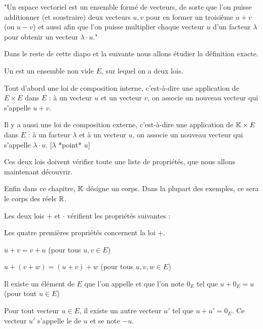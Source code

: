 "Un espace vectoriel est un ensemble formé de vecteurs, de sorte que l'on puisse
additionner (et soustraire) deux vecteurs $u,v$ pour en former un troisième $u+v$ (ou $u-v$)
et aussi afin que l'on puisse multiplier chaque vecteur $u$ d'un facteur $\lambda$ pour obtenir 
un vecteur $\lambda \cdot u$."

\change

Dans le reste de cette diapo et la suivante nous allons étudier la définition exacte.


Un  est un ensemble non vide $E$, sur lequel on a deux lois.

Tout d'abord une loi de composition interne, 
c'est-à-dire une application de $E \times E$ dans $E$ :
à un vecteur $u$ et un vecteur $v$, on associe un nouveau vecteur qui s'appelle $u+v$.

\change

Il y a aussi une loi de composition externe, 
  c'est-à-dire une application de $\mathbb{K} \times E$ dans $E$ : 
à un facteur $\lambda$ et à un vecteur $u$, on associe un nouveau vecteur qui s'appelle $\lambda \cdot u$.
[$\lambda$ *point* $u$]

  
Ces deux lois doivent vérifier toute une liste de propriétés, que nous allons maintenant découvrir.

\change 

Enfin dans ce chapitre, $\mathbb{K}$ désigne un corps. 
Dans la plupart des exemples, ce sera le corps des réels $\mathbb{R}$.

\diapo

Les deux lois $+$ et $\cdot$ vérifient les propriétés suivantes :

Les quatre premières propriétés concernent la loi $+$.

$u + v = v + u$ \quad (pour tous $u,v \in E$)

\change

$u + (v+w) = (u+v) +w$ \quad (pour tous $u,v,w \in E$)

\change

Il existe un élément de $E$ que l'on appelle  et que l'on note  $0_E$ 
tel que $u + 0_E = u$ \quad (pour tout $u \in E$)

\change

Pour tout vecteur $u \in E$, il existe un autre vecteur $u'$ tel que $u + u' = 0_E$. 
Ce vecteur $u'$ s'appelle le  de $u$ et se note $-u$.

\change

